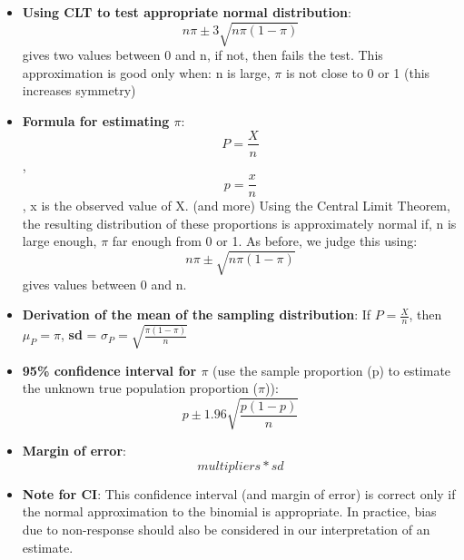 \documentclass[12pt]{article}
\begin{document}
\begin{itemize}
\item \textbf{Using CLT to test appropriate normal distribution}: $$n\pi \pm 3 \sqrt{n\pi (1 - \pi)}$$
gives two values between 0 and n, if not, then fails the test. This approximation is good only when: n is large, $\pi$ is not close to 0 or 1 (this increases symmetry)
\item \textbf{Formula for estimating $\pi$}: $$P = \frac{X}{n}$$, $$p = \frac{x}{n}$$, x is the observed value of X. (and more) Using the Central Limit Theorem, the resulting distribution of these proportions is approximately normal if, n is large enough, $\pi$ far enough from 0 or 1. As before, we judge this using: $$n\pi \pm \sqrt{n\pi(1 - \pi)}$$ gives values between 0 and n.
\item \textbf{Derivation of the mean of the sampling distribution}: If \(P = \frac{X}{n}\), then \(\mu_P = \pi\), \textbf{sd} = \(\sigma_P = \sqrt{\frac{\pi(1 - \pi)}{n}}\)
\item \textbf{95\% confidence interval for $\pi$} (use the sample proportion (p) to estimate the unknown true population proportion ($\pi$)): $$p \pm 1.96 \sqrt{\frac{p(1 - p)}{n}}$$
\item \textbf{Margin of error}: $$multipliers * sd$$
\item \textbf{Note for CI}: This confidence interval (and margin of error) is correct only if the normal approximation to the binomial is appropriate. In practice, bias due to non-response should also be considered in our interpretation of an estimate.
\end{itemize}
\end{document}
